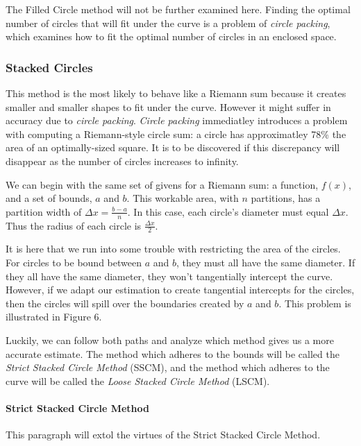 \documentclass{article}
\begin{document}
        The Filled Circle method will not be further examined here. Finding the
        optimal number of circles that will fit under the curve is a problem of
        \emph{circle packing}, which examines how to fit the optimal number of
        circles in an enclosed space.

      \subsubsection{Stacked Circles}
        This method is the most likely to behave like a Riemann sum because it creates
        smaller and smaller shapes to fit under the curve. However it might suffer
        in accuracy due to \emph{circle packing}. \emph{Circle packing} immediatley
        introduces a problem with computing a Riemann-style circle sum: a circle
        has approximatley 78\% the area of an optimally-sized square. It is to
        be discovered if this discrepancy will disappear as the number of circles
        increases to infinity.

        We can begin with the same set of givens for a Riemann sum: a function, \( f(x) \),
        and a set of bounds, \( a \) and \( b \). This workable area, with \( n \)
        partitions, has a partition width of \( \Delta x = \frac{b-a}{n} \). In this
        case, each circle's diameter must equal \( \Delta x \). Thus the radius of
        each circle is \( \frac{\Delta x}{2} \).

        It is here that we run into some trouble with restricting the area of the
        circles. For circles to be bound between \( a \) and \( b \), they must
        all have the same diameter. If they all have the same diameter, they won't
        tangentially intercept the curve. However, if we adapt our estimation to
        create tangential intercepts for the circles, then the circles will spill
        over the boundaries created by \( a \) and \( b \). This problem is illustrated
        in Figure 6.

        Luckily, we can follow both paths and analyze which method gives us a more
        accurate estimate. The method which adheres to the bounds will be called
        the \emph{Strict Stacked Circle Method} (SSCM), and the method which adheres to
        the curve will be called the \emph{Loose Stacked Circle Method} (LSCM).

        \paragraph{Strict Stacked Circle Method}
          This paragraph will extol the virtues of the Strict Stacked Circle Method.
\end{document}
